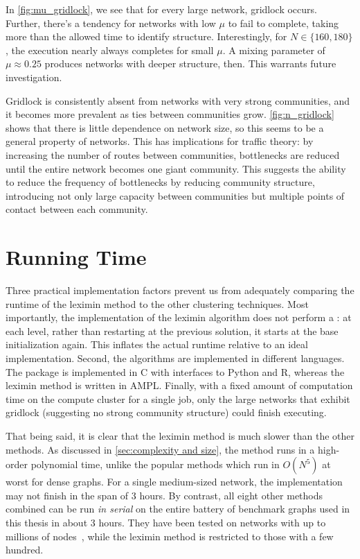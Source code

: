 In \autoref{fig:mu_gridlock}, we see that for every large network, gridlock occurs. Further, there's a tendency for networks with low $\mu$ to fail to complete, taking more than the allowed time to identify structure. Interestingly, for $N \in \{160, 180\}$, the execution nearly always completes for small $\mu$. A mixing parameter of $\mu \approx0.25$ produces networks with deeper structure, then. This warrants future investigation. 

Gridlock is consistently absent from networks with very strong communities, and it becomes more prevalent as ties between communities grow. \autoref{fig:n_gridlock} shows that there is little dependence on network size, so this seems to be a general property of networks. This has implications for traffic theory: by increasing the number of routes between communities, bottlenecks are reduced until the entire network becomes one giant community. This suggests the ability to reduce the frequency of bottlenecks by reducing community structure, introducing not only large capacity between communities but multiple points of contact between each community.

\section{Running Time}

Three practical implementation factors prevent us from adequately comparing the runtime of the leximin method to the other clustering techniques. Most importantly, the implementation of the leximin algorithm does not perform a : at each level, rather than restarting at the previous solution, it starts at the base initialization again. This inflates the actual runtime relative to an ideal implementation. Second, the algorithms are implemented in different languages. The  package is implemented in C with interfaces to Python and R, whereas the leximin method is written in AMPL. Finally, with a fixed amount of computation time on the compute cluster for a single job, only the large networks that exhibit gridlock (suggesting no strong community structure) could finish executing.

That being said, it is clear that the leximin method is much slower than the other methods. As discussed in \autoref{sec:complexity and size}, the method runs in a high-order polynomial time, unlike the popular methods which run in $O(N^5)$ at worst for dense graphs. For a single medium-sized network, the implementation may not finish in the span of 3 hours.  By contrast, all eight other methods combined can be run \emph{in serial} on the entire battery of benchmark graphs used in this thesis in about 3 hours. They have been tested on networks with up to millions of nodes~\cite{hric2014community}, while the leximin method is restricted to those with a few hundred.

